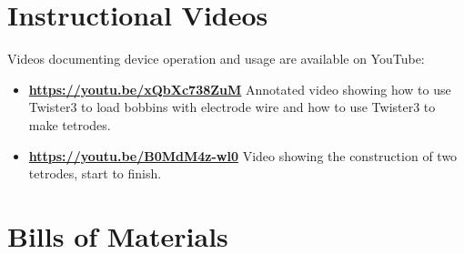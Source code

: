 \documentclass[11pt,a4paper]{article}
\begin{document}
\medskip




\newpage

\begin{appendices}

\section{Instructional Videos}\label{s:videos}

Videos documenting device operation and usage are available on YouTube:

\begin{itemize}
    \item \textbf{\url{https://youtu.be/xQbXc738ZuM}} Annotated video showing
        how to use Twister3 to load bobbins with electrode wire and how to use
        Twister3 to make tetrodes.
    \item \textbf{\url{https://youtu.be/B0MdM4z-wl0}} Video showing the
        construction of two tetrodes, start to finish.
\end{itemize}

\section{Bills of Materials}\label{s:boms}





\end{appendices}
\end{document}
